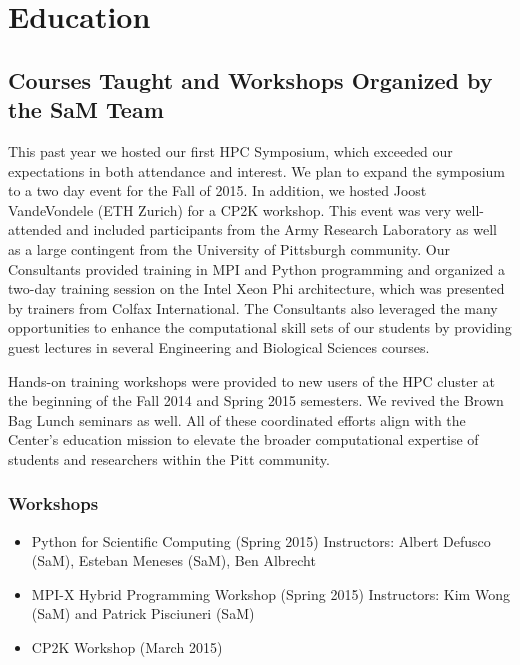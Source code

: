 \chapter{Education}

\section{Courses Taught and Workshops Organized by the SaM
Team}

This past year we hosted our first HPC Symposium, which exceeded our
expectations in both attendance and interest.  We plan to expand the symposium
to a two day event for the Fall of 2015.  In addition, we hosted Joost
VandeVondele (ETH Zurich) for a CP2K workshop.  This event was very
well-attended and included participants from the Army Research Laboratory as
well as a large contingent from the University of Pittsburgh community.  Our Consultants provided training in MPI and Python programming and organized a
two-day training session on the Intel Xeon Phi architecture, which was
presented by trainers from Colfax International.  The Consultants also leveraged the many opportunities to enhance the
computational skill sets of our students by providing guest lectures in several
Engineering and Biological Sciences courses.

Hands-on training workshops were provided to new users of the HPC
cluster at the beginning of the Fall 2014 and Spring 2015 semesters.  We
revived the Brown Bag Lunch seminars as well.  All of these coordinated
efforts align with the Center's education mission to elevate the broader
computational expertise of students and researchers within the Pitt community.

\subsection{Workshops}
\begin{itemize}
    \item Python for Scientific Computing (Spring 2015)
          Instructors: Albert Defusco (SaM), Esteban Meneses (SaM), Ben Albrecht

    \item MPI-X Hybrid Programming Workshop (Spring 2015)
          Instructors: Kim Wong (SaM) and Patrick Pisciuneri (SaM)

    \item CP2K Workshop (March 2015)

\end{itemize}

